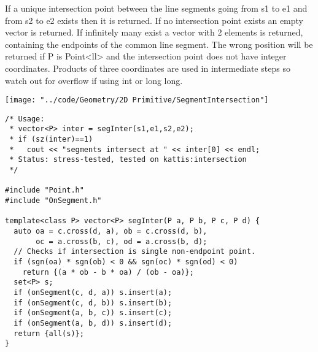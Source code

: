\begin{minipage}{75mm}
If a unique intersection point between the line segments going from s1 to e1 and from s2 to e2 exists then it is returned.
If no intersection point exists an empty vector is returned. If infinitely many exist a vector with 2 elements is returned, containing the endpoints of the common line segment.
The wrong position will be returned if P is Point<ll> and the intersection point does not have integer coordinates.
Products of three coordinates are used in intermediate steps so watch out for overflow if using int or long long.
\end{minipage}
\begin{minipage}{15mm}
\texttt{[image: "../code/Geometry/2D Primitive/SegmentIntersection"]}
\end{minipage}
\begin{verbatim}
/* Usage:
 * vector<P> inter = segInter(s1,e1,s2,e2);
 * if (sz(inter)==1)
 *   cout << "segments intersect at " << inter[0] << endl;
 * Status: stress-tested, tested on kattis:intersection
 */

#include "Point.h"
#include "OnSegment.h"

template<class P> vector<P> segInter(P a, P b, P c, P d) {
  auto oa = c.cross(d, a), ob = c.cross(d, b),
       oc = a.cross(b, c), od = a.cross(b, d);
  // Checks if intersection is single non-endpoint point.
  if (sgn(oa) * sgn(ob) < 0 && sgn(oc) * sgn(od) < 0)
    return {(a * ob - b * oa) / (ob - oa)};
  set<P> s;
  if (onSegment(c, d, a)) s.insert(a);
  if (onSegment(c, d, b)) s.insert(b);
  if (onSegment(a, b, c)) s.insert(c);
  if (onSegment(a, b, d)) s.insert(d);
  return {all(s)};
}
\end{verbatim}

